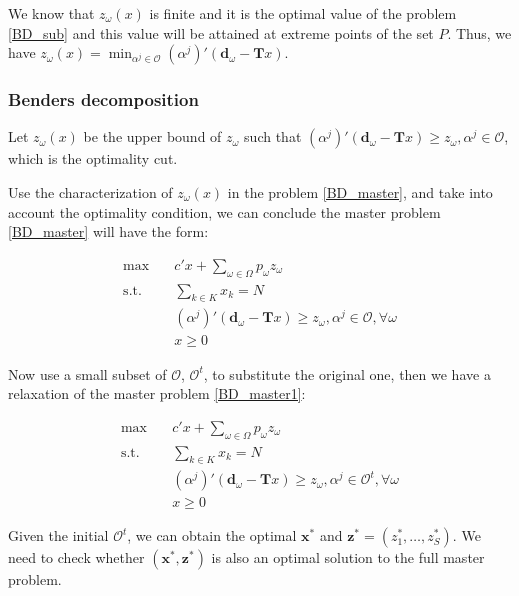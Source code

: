 We know that $z_{\omega}(x)$ is finite and it is the optimal value of the problem \eqref{BD_sub} and this value will be attained at extreme points of the set $P$. Thus, we have $z_{\omega}(x) = \min_{\alpha^j \in \mathcal{O}} (\alpha^{j}){'}(\mathbf{d}_{\omega}- \mathbf{T}x)$. 

\subsubsection{Benders decomposition}

Let $z_{\omega}(x)$ be the upper bound of $z_{\omega}$ such that $(\alpha^{j}){'}(\mathbf{d}_{\omega}- \mathbf{T}x) \geq z_{\omega}, \alpha^j \in \mathcal{O}$, which is the optimality cut.

Use the characterization of $z_{\omega}(x)$ in the problem 
\eqref{BD_master}, and take into account the optimality condition, we can conclude the master problem \eqref{BD_master} will have the form:

\begin{equation}\label{BD_master1}
  \begin{aligned}
    \max \quad & c{'} x + \sum_{\omega \in \Omega} p_{\omega} z_{\omega} \\
    \text {s.t.} \quad & \sum_{k \in K} x_k = N \\
    & (\alpha^{j}){'}(\mathbf{d}_{\omega}- \mathbf{T}x) \geq z_{\omega}, \alpha^j \in \mathcal{O}, \forall \omega \\
     & x \geq 0
  \end{aligned}
\end{equation}

Now use a small subset of $\mathcal{O}$, $\mathcal{O}^t$, to substitute the original one, then we have a relaxation of the master problem \eqref{BD_master1}:

\begin{equation}\label{BD_master2}
  \begin{aligned}
    \max \quad & c{'} x + \sum_{\omega \in \Omega} p_{\omega} z_{\omega} \\
    \text {s.t.} \quad & \sum_{k \in K} x_k = N \\
    & (\alpha^{j}){'}(\mathbf{d}_{\omega}- \mathbf{T}x) \geq z_{\omega}, \alpha^j \in \mathcal{O}^{t}, \forall \omega \\
     & x \geq 0
  \end{aligned}
\end{equation}


Given the initial $\mathcal{O}^{t}$, we can obtain the optimal $\mathbf{x}^{*}$ and $\mathbf{z}^{*}=(z^{*}_1,\ldots, z^{*}_S)$. We need to check whether $(\mathbf{x}^{*}, \mathbf{z}^{*})$ is also an optimal solution to the full master problem. 

